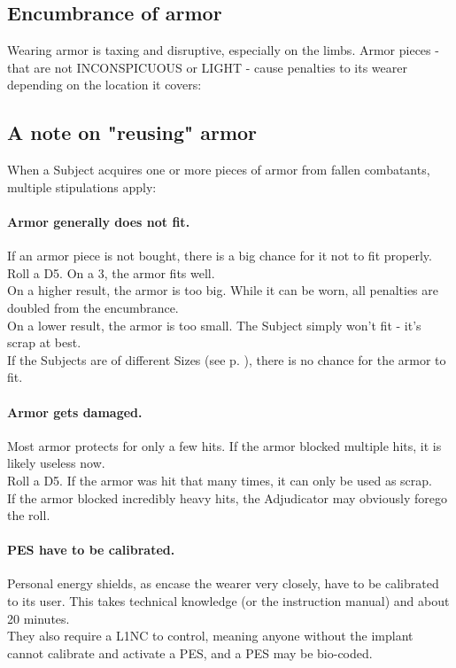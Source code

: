\subsection*{Encumbrance of armor}
Wearing armor is taxing and disruptive, especially on the limbs.
Armor pieces
- that are not INCONSPICUOUS or LIGHT -
cause penalties to its wearer depending on the location it covers:
\par%
\hspace{10mm}

\subsection*{A note on "reusing" armor}
When a Subject acquires one or more pieces of armor from fallen combatants,
multiple stipulations apply:

\paragraph{Armor generally does not fit.}
If an armor piece is not bought,
there is a big chance for it not to fit properly.
\\%
Roll a D5.
On a 3, the armor fits well.
\\%
On a higher result, the armor is too big.
While it can be worn,
all penalties are doubled from the encumbrance.
\\%
On a lower result, the armor is too small.
The Subject simply won't fit
- it's scrap at best.
\\%
If the Subjects are of different Sizes (see p. \pageref{sizestable}),
there is no chance for the armor to fit.

\paragraph{Armor gets damaged.}
Most armor protects for only a few hits.
If the armor blocked multiple hits,
it is likely useless now.
\\%
Roll a D5.
If the armor was hit that many times,
it can only be used as scrap.
\\%
If the armor blocked incredibly heavy hits,
the Adjudicator may obviously forego the roll.

\paragraph{PES have to be calibrated.}
Personal energy shields,
as encase the wearer very closely,
have to be calibrated to its user.
This takes technical knowledge (or the instruction manual)
and about 20 minutes.
\\%
They also require a L1NC to control,
meaning anyone without the implant cannot calibrate and activate a PES,
and a PES may be bio-coded.
